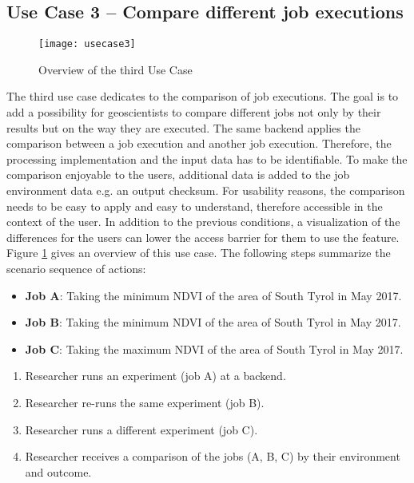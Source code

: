 \documentclass[draft,final]{vutinfth} %
\begin{document}
\subsection{Use Case 3 – Compare different job executions}\label{UseCase3}
\begin{figure}[h]
	\centering
	\texttt{[image: usecase3]}
	\caption{Overview of the third Use Case}
	\label{fig:usecase3} %
\end{figure}
The third use case dedicates to the comparison of job executions. The goal is to add a possibility for geoscientists to compare different jobs not only by their results but on the way they are executed. The same backend applies the comparison between a job execution and another job execution. Therefore, the processing implementation and the input data has to be identifiable. To make the comparison enjoyable to the users, additional data is added to the job environment data e.g. an output checksum. For usability reasons, the comparison needs to be easy to apply and easy to understand, therefore accessible in the context of the user. In addition to the previous conditions, a visualization of the differences for the users can lower the access barrier for them to use the feature. Figure \ref{fig:usecase3} gives an overview of this use case.
The following steps summarize the scenario sequence of actions: \\

\begin{itemize}
	\item \textbf{Job A}: Taking the minimum NDVI of the area of South Tyrol in May 2017. 
	\item \textbf{Job B}: Taking the minimum NDVI of the area of South Tyrol in May 2017.
	\item \textbf{Job C}: Taking the maximum NDVI of the area of South Tyrol in May 2017.
\end{itemize}

\begin{enumerate}
	\item Researcher runs an experiment (job A) at a backend.
	\item Researcher re-runs the same experiment (job B).
	\item Researcher runs a different experiment (job C).   
	\item Researcher receives a comparison of the jobs (A, B, C) by their environment and outcome.
\end{enumerate}
\end{document}
